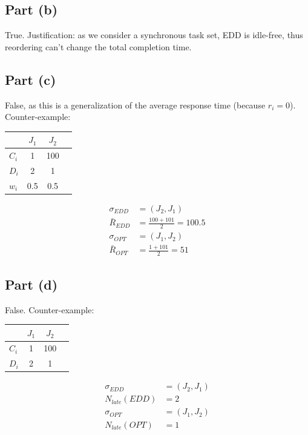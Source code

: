 \documentclass[a4paper,parskip,headheight=38pt]{scrartcl} %
\begin{document}
\subsection*{Part (b)}

True.  Justification: as we consider a synchronous task set, EDD is
idle-free, thus reordering can't change the total completion time.

\subsection*{Part (c)}

False, as this is a generalization of the average response time
(because $r_i = 0$).  Counter-example:

\begin{tabular}{l|ccc}
      & $J_1$ & $J_2$ \\ \hline
$C_i$ &   1   &  100  \\
$D_i$ &   2   &   1   \\
$w_i$ &  0.5  &  0.5  \\
\end{tabular}

\begin{align*}
    \sigma_{EDD} &= (J_2, J_1) \\
    \bar{R}_{EDD} &= \frac{100+101}{2} = 100.5 \\
    \sigma_{OPT} &= (J_1, J_2) \\
    \bar{R}_{OPT} &= \frac{1+101}{2} = 51
\end{align*}

\subsection*{Part (d)}

False.  Counter-example:

\begin{tabular}{l|ccc}
      & $J_1$ & $J_2$ \\ \hline
$C_i$ &   1   &  100  \\
$D_i$ &   2   &   1   \\
\end{tabular}

\begin{align*}
    \sigma_{EDD} &= (J_2, J_1) \\
    N_{late}(EDD) &= 2 \\
    \sigma_{OPT} &= (J_1, J_2) \\
    N_{late}(OPT) &= 1 \\
\end{align*}
\end{document}
